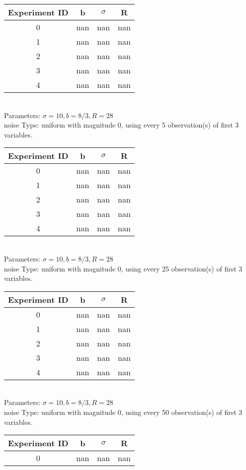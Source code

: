 \begin{multicols}{3}
\begin{tabular}{cccc}
\hline Experiment ID & b & $\sigma$ & R \\ \hline 
0 & nan & nan & nan\\ \hline 
 1 & nan & nan & nan\\ \hline 
 2 & nan & nan & nan\\ \hline 
 3 & nan & nan & nan\\ \hline 
 4 & nan & nan & nan\\ \hline 
 \end{tabular}\\
Parameters: $\sigma=10, b=8/3, R=28$\\
noise Type: uniform with magnitude 0, using every 5 observation(s) of first 3 variables.\\
\begin{tabular}{cccc}
\hline Experiment ID & b & $\sigma$ & R \\ \hline 
0 & nan & nan & nan\\ \hline 
 1 & nan & nan & nan\\ \hline 
 2 & nan & nan & nan\\ \hline 
 3 & nan & nan & nan\\ \hline 
 4 & nan & nan & nan\\ \hline 
 \end{tabular}\\
Parameters: $\sigma=10, b=8/3, R=28$\\
noise Type: uniform with magnitude 0, using every 25 observation(s) of first 3 variables.\\
\begin{tabular}{cccc}
\hline Experiment ID & b & $\sigma$ & R \\ \hline 
0 & nan & nan & nan\\ \hline 
 1 & nan & nan & nan\\ \hline 
 2 & nan & nan & nan\\ \hline 
 3 & nan & nan & nan\\ \hline 
 4 & nan & nan & nan\\ \hline 
 \end{tabular}\\
Parameters: $\sigma=10, b=8/3, R=28$\\
noise Type: uniform with magnitude 0, using every 50 observation(s) of first 3 variables.\\
\begin{tabular}{cccc}
\hline Experiment ID & b & $\sigma$ & R \\ \hline 
0 & nan & nan & nan\\ \hline 

\end{tabular}
\end{multicols}
